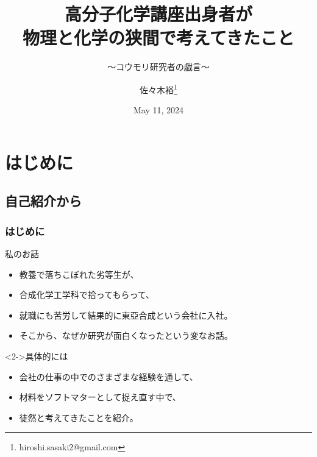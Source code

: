 \documentclass[unicode,12pt]{beamer}%
\title
{高分子化学講座出身者が\\物理と化学の狭間で考えてきたこと}
\subtitle{～コウモリ研究者の戯言～}
\author[佐々木]{佐々木裕\thanks{hiroshi.sasaki2@gmail.com}}
\institute[21期]{21期 （元 東亞合成株式会社）}
\date{May 11, 2024}
\begin{document}
\begin{frame}\frametitle{}
	\titlepage
\end{frame}
\section{はじめに}
\subsection{自己紹介から}
\begin{frame}
    \frametitle{はじめに}
    \begin{block}{私のお話}
        \begin{itemize}
            \item 教養で落ちこぼれた劣等生が、 
            \item 合成化学工学科で拾ってもらって、
            \item 就職にも苦労して結果的に東亞合成という会社に入社。
            \item そこから、なぜか研究が面白くなったという変なお話。
        \end{itemize}
    \end{block}
    \begin{exampleblock}<2->{具体的には}
        \begin{itemize}
            \item 会社の仕事の中でのさまざまな経験を通して、
            \item 材料をソフトマターとして捉え直す中で、
            \item 徒然と考えてきたことを紹介。
        \end{itemize}
    \end{exampleblock}
    \vspace{1mm}
\end{frame}
\end{document}
